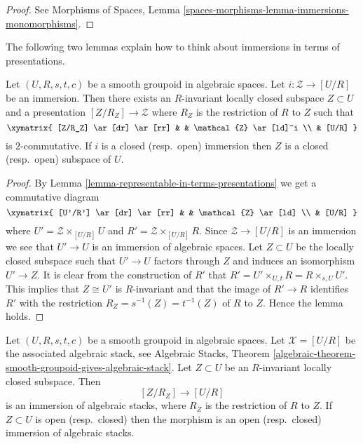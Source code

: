 \begin{proof}
See
Morphisms of Spaces,
Lemma \ref{spaces-morphisms-lemma-immersions-monomorphisms}.
\end{proof}

\noindent
The following two lemmas explain how to think about
immersions in terms of presentations.

\begin{lemma}
\label{lemma-immersion-into-presentation}
Let $(U, R, s, t, c)$ be a smooth groupoid in algebraic spaces.
Let $i : \mathcal{Z} \to [U/R]$ be an immersion.
Then there exists an $R$-invariant locally closed subspace
$Z \subset U$ and a presentation $[Z/R_Z] \to \mathcal{Z}$
where $R_Z$ is the restriction of $R$ to $Z$ such that
$$
\xymatrix{
[Z/R_Z] \ar[dr] \ar[rr] & & \mathcal{Z} \ar[ld]^i \\
& [U/R]
}
$$
is $2$-commutative. If $i$ is a closed (resp.\ open) immersion
then $Z$ is a closed (resp.\ open) subspace of $U$.
\end{lemma}

\begin{proof}
By
Lemma \ref{lemma-representable-in-terms-presentations}
we get a commutative diagram
$$
\xymatrix{
[U'/R'] \ar[dr] \ar[rr] & & \mathcal{Z} \ar[ld] \\
& [U/R]
}
$$
where $U' = \mathcal{Z} \times_{[U/R]} U$ and
$R' = \mathcal{Z} \times_{[U/R]} R$.
Since $\mathcal{Z} \to [U/R]$ is an immersion we see that
$U' \to U$ is an immersion of algebraic spaces. Let $Z \subset U$
be the locally closed subspace such that $U' \to U$ factors through
$Z$ and induces an isomorphism $U' \to Z$.
It is clear from the construction of $R'$ that
$R' = U' \times_{U, t} R = R \times_{s, U} U'$.
This implies that $Z \cong U'$ is $R$-invariant and that the image of
$R' \to R$ identifies $R'$ with the restriction
$R_Z = s^{-1}(Z) = t^{-1}(Z)$ of $R$ to $Z$. Hence the lemma holds.
\end{proof}

\begin{lemma}
\label{lemma-immersion-presentation}
Let $(U, R, s, t, c)$ be a smooth groupoid in algebraic spaces.
Let $\mathcal{X} = [U/R]$ be the associated algebraic stack, see
Algebraic Stacks,
Theorem \ref{algebraic-theorem-smooth-groupoid-gives-algebraic-stack}.
Let $Z \subset U$ be an $R$-invariant locally closed subspace. Then
$$
[Z/R_Z] \longrightarrow [U/R]
$$
is an immersion of algebraic stacks, where $R_Z$ is the restriction
of $R$ to $Z$. If $Z \subset U$ is open (resp.\ closed) then the morphism
is an open (resp.\ closed) immersion of algebraic stacks.
\end{lemma}

